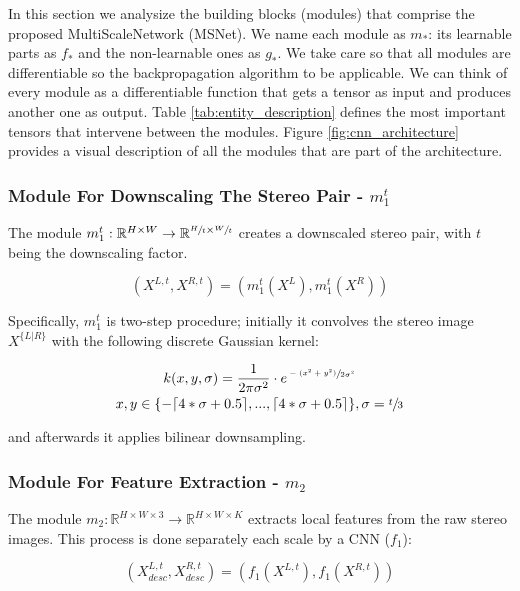 \documentclass[runningheads]{llncs}
\begin{document}
In this section we analysize the building blocks (modules) that comprise the proposed MultiScaleNetwork (MSNet). We name each module as $m_*$: its learnable parts as $f_*$ and the non-learnable ones as $g_*$. We take care so that all modules are differentiable so the backpropagation algorithm to be applicable. We can think of every module as a differentiable function that gets a tensor as input and produces another one as output. Table \ref{tab:entity_description} defines the most important tensors that intervene between the modules. Figure \ref{fig:cnn_architecture} provides a visual description of all the modules that are part of the architecture.

\subsubsection{Module For Downscaling The Stereo Pair - $m_1^t$}


The module $m_1^t: \mathbb{R}^{H \times W} \rightarrow \mathbb{R}^{\sfrac{H}{t} \times \sfrac{W}{t}}$ creates a downscaled stereo pair, with $t$ being the downscaling factor. 

\begin{equation} \label{eq:g1}
    (X^{L,t}, X^{R,t}) = (m_1^t(X^L), m_1^t(X^R))
\end{equation}{}

Specifically, $m_1^t$ is two-step procedure; initially it convolves the stereo image $X^{\{L|R\}}$ with the following discrete Gaussian kernel:

\begin{gather} \label{eq:g1_kernel}
    k(x, y, \sigma) = \frac{1}{2\pi\sigma^2} \cdot e^{\sfrac{-(x^2 + y^2)}{2\sigma^2}} \\
    x,y \in \{-\lceil 4*\sigma + 0.5 \rceil, ..., \lceil 4*\sigma + 0.5 \rceil\}, \sigma = \sfrac{t}{3}
\end{gather}

and afterwards it applies bilinear downsampling.


\subsubsection{Module For Feature Extraction - $m_2$}

The module $m_2: \mathbb{R}^{H \times W \times 3} \rightarrow \mathbb{R}^{H \times W \times K}$ extracts local features from the raw stereo images. This process is done separately each scale by a CNN ($f_1$):

\begin{equation} \label{eq:f_1}
    (X^{L,t}_{desc}, X^{R,t}_{desc}) = (f_1(X^{L,t}), f_1(X^{R, t}))
\end{equation} 
\end{document}
